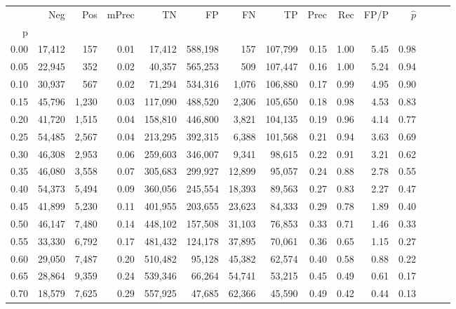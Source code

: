 \begin{tabular}{rrrrrrrrrrrrrrr}
\toprule
{} &     Neg &    Pos & mPrec &       TN &       FP &       FN &       TP &  Prec &   Rec &  FP/P & $\hat{p}$ \\
p    &         &        &       &          &          &          &          &       &       &       &           \\
\midrule
0.00 &  17,412 &    157 &  0.01 &   17,412 &  588,198 &      157 &  107,799 &  0.15 &  1.00 &  5.45 &      0.98 \\
0.05 &  22,945 &    352 &  0.02 &   40,357 &  565,253 &      509 &  107,447 &  0.16 &  1.00 &  5.24 &      0.94 \\
0.10 &  30,937 &    567 &  0.02 &   71,294 &  534,316 &    1,076 &  106,880 &  0.17 &  0.99 &  4.95 &      0.90 \\
0.15 &  45,796 &  1,230 &  0.03 &  117,090 &  488,520 &    2,306 &  105,650 &  0.18 &  0.98 &  4.53 &      0.83 \\
0.20 &  41,720 &  1,515 &  0.04 &  158,810 &  446,800 &    3,821 &  104,135 &  0.19 &  0.96 &  4.14 &      0.77 \\
0.25 &  54,485 &  2,567 &  0.04 &  213,295 &  392,315 &    6,388 &  101,568 &  0.21 &  0.94 &  3.63 &      0.69 \\
0.30 &  46,308 &  2,953 &  0.06 &  259,603 &  346,007 &    9,341 &   98,615 &  0.22 &  0.91 &  3.21 &      0.62 \\
0.35 &  46,080 &  3,558 &  0.07 &  305,683 &  299,927 &   12,899 &   95,057 &  0.24 &  0.88 &  2.78 &      0.55 \\
0.40 &  54,373 &  5,494 &  0.09 &  360,056 &  245,554 &   18,393 &   89,563 &  0.27 &  0.83 &  2.27 &      0.47 \\
0.45 &  41,899 &  5,230 &  0.11 &  401,955 &  203,655 &   23,623 &   84,333 &  0.29 &  0.78 &  1.89 &      0.40 \\
0.50 &  46,147 &  7,480 &  0.14 &  448,102 &  157,508 &   31,103 &   76,853 &  0.33 &  0.71 &  1.46 &      0.33 \\
0.55 &  33,330 &  6,792 &  0.17 &  481,432 &  124,178 &   37,895 &   70,061 &  0.36 &  0.65 &  1.15 &      0.27 \\
0.60 &  29,050 &  7,487 &  0.20 &  510,482 &   95,128 &   45,382 &   62,574 &  0.40 &  0.58 &  0.88 &      0.22 \\
0.65 &  28,864 &  9,359 &  0.24 &  539,346 &   66,264 &   54,741 &   53,215 &  0.45 &  0.49 &  0.61 &      0.17 \\
0.70 &  18,579 &  7,625 &  0.29 &  557,925 &   47,685 &   62,366 &   45,590 &  0.49 &  0.42 &  0.44 &      0.13 \\

\end{tabular}
